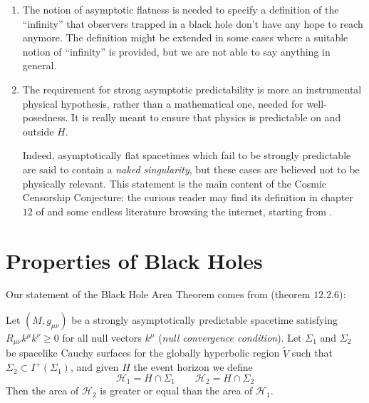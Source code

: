 \begin{remark}
	\begin{enumerate}[label=(\Roman*)]
		\item The notion of asymptotic flatness is needed to specify a definition of the ``infinity'' that observers trapped in a black hole don't have any hope to reach anymore. The definition might be extended in some cases where a suitable notion of ``infinity'' is provided, but we are not able to say anything in general.
		\item The requirement for strong asymptotic predictability is more an instrumental physical hypothesis, rather than a mathematical one, needed for well-posedness. It is really meant to ensure that physics is predictable on and outside \(H\).
		
		Indeed, asymptotically flat spacetimes which fail to be strongly predictable are said to contain a \emph{naked singularity}, but these cases are believed not to be physically relevant. This statement is the main content of the Cosmic Censorship Conjecture: the curious reader may find its definition in chapter \(12\) of \cite{wald2010general} and some endless literature browsing the internet, starting from \cite{dias2018strong}.
	\end{enumerate}
\end{remark}


\section{Properties of Black Holes}

Our statement of the Black Hole Area Theorem comes from \cite{wald2010general} (theorem \(12.2.6\)):
\begin{theorem}
	Let \((M, g_{\mu\nu})\) be a strongly asymptotically predictable spacetime satisfying \(R_{\mu\nu}k^{\mu}k^{\nu} \ge 0\) for all null vectors \(k^{\mu}\) (\emph{null convergence condition}). Let \(\Sigma_1\) and \(\Sigma_2\) be spacelike Cauchy surfaces for the globally hyperbolic region \(\tilde{V}\) such that \(\Sigma_2 \subset I^+(\Sigma_1)\), and given \(H\) the event horizon we define
	\[
	\mathscr{H}_1 = H \cap \Sigma_1 \quad \quad \mathscr{H}_2 = H \cap \Sigma_2
	\]
	Then the area of \(\mathscr{H}_2\) is greater or equal than the area of \(\mathscr{H}_1\).
\end{theorem}

